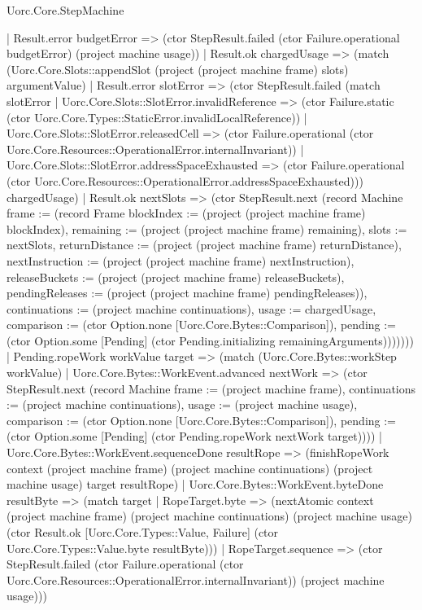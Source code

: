\begin{lexlean}{Uorc.Core.StepMachine}
\begin{semanticmodule}
{        | Result.error budgetError => (ctor StepResult.failed (ctor Failure.operational budgetError) (project machine usage))
        | Result.ok chargedUsage => (match (Uorc.Core.Slots::appendSlot (project (project machine frame) slots) argumentValue)
          | Result.error slotError => (ctor StepResult.failed (match slotError
            | Uorc.Core.Slots::SlotError.invalidReference => (ctor Failure.static (ctor Uorc.Core.Types::StaticError.invalidLocalReference))
            | Uorc.Core.Slots::SlotError.releasedCell => (ctor Failure.operational (ctor Uorc.Core.Resources::OperationalError.internalInvariant))
            | Uorc.Core.Slots::SlotError.addressSpaceExhausted => (ctor Failure.operational (ctor Uorc.Core.Resources::OperationalError.addressSpaceExhausted))) chargedUsage)
          | Result.ok nextSlots => (ctor StepResult.next (record Machine {frame := (record Frame {blockIndex := (project (project machine frame) blockIndex), remaining := (project (project machine frame) remaining), slots := nextSlots, returnDistance := (project (project machine frame) returnDistance), nextInstruction := (project (project machine frame) nextInstruction), releaseBuckets := (project (project machine frame) releaseBuckets), pendingReleases := (project (project machine frame) pendingReleases)}), continuations := (project machine continuations), usage := chargedUsage, comparison := (ctor Option.none [Uorc.Core.Bytes::Comparison]), pending := (ctor Option.some [Pending] (ctor Pending.initializing remainingArguments))})))))
    | Pending.ropeWork workValue target => (match (Uorc.Core.Bytes::workStep workValue)
      | Uorc.Core.Bytes::WorkEvent.advanced nextWork => (ctor StepResult.next (record Machine {frame := (project machine frame), continuations := (project machine continuations), usage := (project machine usage), comparison := (ctor Option.none [Uorc.Core.Bytes::Comparison]), pending := (ctor Option.some [Pending] (ctor Pending.ropeWork nextWork target))}))
      | Uorc.Core.Bytes::WorkEvent.sequenceDone resultRope => (finishRopeWork context (project machine frame) (project machine continuations) (project machine usage) target resultRope)
      | Uorc.Core.Bytes::WorkEvent.byteDone resultByte => (match target
        | RopeTarget.byte => (nextAtomic context (project machine frame) (project machine continuations) (project machine usage) (ctor Result.ok [Uorc.Core.Types::Value, Failure] (ctor Uorc.Core.Types::Value.byte resultByte)))
        | RopeTarget.sequence => (ctor StepResult.failed (ctor Failure.operational (ctor Uorc.Core.Resources::OperationalError.internalInvariant)) (project machine usage)))
}
\end{semanticmodule}
\end{lexlean}
